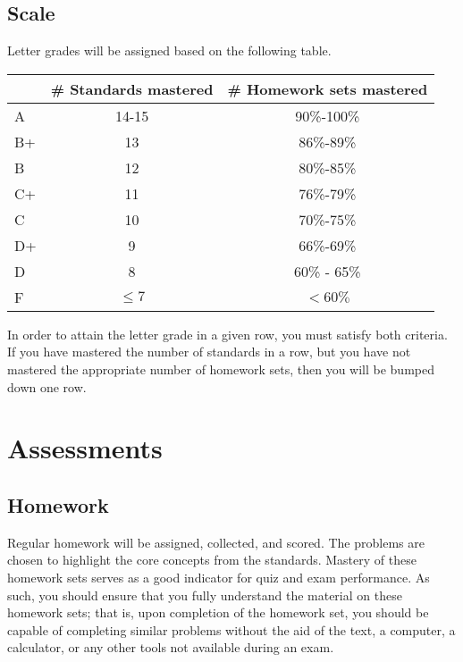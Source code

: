 \documentclass[12pt]{amsart}
\begin{document}
\subsection*{Scale}
Letter grades will be assigned based on the following table.
\begin{center}
  \begin{tabular}{|l|c|c|}
    \hline
    & \# Standards mastered & \# Homework sets mastered\\
    \hline
    A & 14-15 & 90\%-100\%\\
    \hline
    B+ & 13 & 86\%-89\%\\
    \hline
    B & 12 & 80\%-85\%\\
    \hline
    C+ & 11 & 76\%-79\%\\
    \hline
    C & 10 & 70\%-75\%\\
    \hline
    D+ & 9 & 66\%-69\%\\
    \hline
    D & 8& 60\% - 65\%\\
    \hline
    F & \(\leq 7\) & \(< 60\%\)\\
    \hline
  \end{tabular}
\end{center}
In order to attain the letter grade in a given row, you must satisfy both criteria.
If you have mastered the number of standards in a row, but you have not mastered the appropriate number of homework sets, then you will be bumped down one row.

\section*{Assessments}

\subsection*{Homework}
Regular homework will be assigned, collected, and scored.
The problems are chosen to highlight the core concepts from the standards.
Mastery of these homework sets serves as a good indicator for quiz and exam performance.
As such, you should ensure that you fully understand the material on these homework sets; that is, upon completion of the homework set, you should be capable of completing similar problems without the aid of the text, a computer, a calculator, or any other tools not available during an exam.

\end{document}
